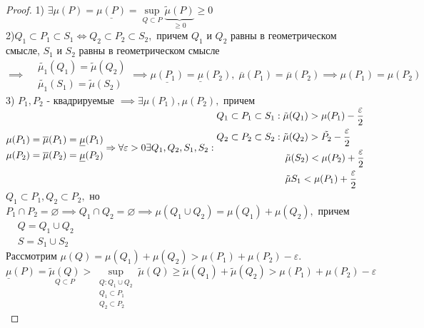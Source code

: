 \documentclass[../main.tex]{subfiles}
\begin{document}
\begin{proof}
    1) $ \exists\mu(P)=\underline{\mu(P)}=\underset{Q\subset P}{\sup}{\underbrace{\tilde{\mu}(P)}_{\geqslant 0}}\geqslant 0$
    \\2)$Q_{1} \subset P_{1} \subset S_{1}\Leftrightarrow Q_{2} \subset P_{2} \subset S_{2},$ причем $Q_{1}$ и $Q_{2}$ равны в геометрическом  смысле, $S_{1}$ и $S_{2}$ равны в геометрическом смысле $\implies \begin{aligned}&\tilde{\mu_{1}}(Q_{1})=\tilde{\mu}(Q_{2}) \\ &\tilde{\mu_{1}}(S_{1})=\tilde{\mu}(S_{2})\end{aligned} \implies \underline{\mu(P_{1})}=\underline{\mu}(P_{2}), \; \overline{\mu}(P_{1})=\overline{  \mu}(P_{2})\implies \mu(P_{1})=\mu(P_{2})$
    \\3) $P_{1}, P_{2}$ - квадрируемые $\implies \exists \mu(P_{1}),\mu (P_{2}),$ причем $\begin{aligned}&\mu(P_{1})= \overline{\mu}(P_{1})= \underline{\mu}(P_{1}) \\ &\mu(P_{2})=\overline{\mu}(P_{2})=\underline{\mu}(P_{2}) \end{aligned}   \implies \forall \varepsilon >0 \exists Q_{1},Q_{2} ,S_{1},S_{2}:\\\begin{aligned} &Q_{1}\subset P_{1}\subset S_{1}: \tilde{\mu}(Q_{1} )>\mu(P_{1}) - \frac{\epsilon}{2}\\ &Q_{2}\subset P_{2} \subset S_{2}:\tilde{\mu}(Q_{2})>\tilde{P_{2}}-\frac{\epsilon}{2}\\ &\phantom{\subset Q_{2} \subset P_{2} \subset S_{2}}\tilde{\mu}(S_{2})< \mu (P_{2})+\frac{\varepsilon}{2} \\ &\phantom{\subset Q_{2} \subset P_{2} \subset S_{2}}\tilde{\mu}{S_{1}}< \mu(P_{1})+\frac{\varepsilon}{2}\end{aligned}$ 
    \\ $Q_{1}\subset P_{1}, Q_{2} \subset P_{2} ,$ но $ P_{1} \cap P_{2}=\varnothing \implies Q_{1} \cap Q_{2} =\varnothing \implies \mu(Q_{1} \cup Q_{2})=\mu(Q_{1})+\mu(Q_{2}),$ причем $\begin{aligned} &Q=Q_{1} \cup Q_{2} \\ &S= S_{1} \cup S_{2} \end{aligned}$
    \\ Рассмотрим $ \mu (Q) = \mu (Q_{1})+ \mu(Q_{2})> \mu(P_{1}) + \mu(P_{2})-\varepsilon.$
    \\ $\underline{\mu}(P)=\underset{Q\subset P}{\tilde{\mu}(Q)}>\underset{\substack{Q: Q_{1} \cup Q_{2} \\ Q_{1} \subset P_{1} \\ Q_{2} \subset P_{2}}}{\sup}{\tilde{\mu}(Q)}\geqslant \tilde{\mu}(Q_{1})+ \tilde{\mu}(Q_{2}) > \mu(P_{1})+ \mu(P_{2})-\varepsilon$ 

\end{proof}
\end{document}
